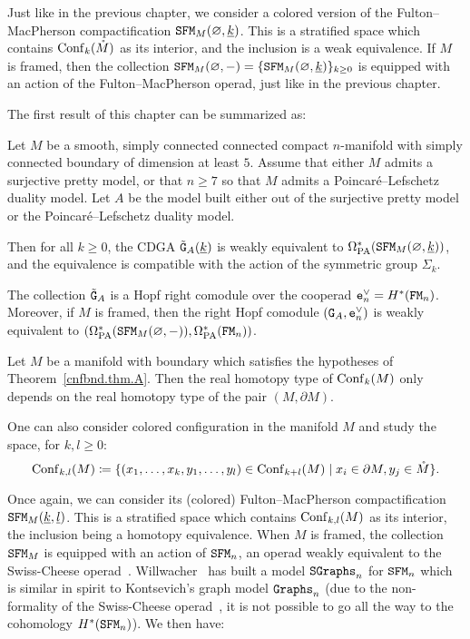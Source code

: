 Just like in the previous chapter, we consider a colored version of the Fulton--MacPherson compactification $\mathtt{SFM}_{M}(\varnothing, \underline{k})$.
This is a stratified space which contains $\operatorname{Conf}_{k}(\mathring{M})$ as its interior, and the inclusion is a weak equivalence.
If $M$ is framed, then the collection $\mathtt{SFM}_{M}(\varnothing, -) = \{ \mathtt{SFM}_{M}(\varnothing, \underline{k}) \}_{k \geq 0}$ is equipped with an action of the Fulton--MacPherson operad, just like in the previous chapter.

The first result of this chapter can be summarized as:
\begin{theoremintro}
  \label{cnfbnd.thm.A}
  Let $M$ be a smooth, simply connected connected compact $n$-manifold with simply connected boundary of dimension at least $5$.
  Assume that either $M$ admits a surjective pretty model, or that $n \geq 7$ so that $M$ admits a Poincaré--Lefschetz duality model.
  Let $A$ be the model built either out of the surjective pretty model or the Poincaré--Lefschetz duality model.

  Then for all $k \geq 0$, the CDGA $\tilde{\mathtt{G}}_{A}(\underline{k})$ is weakly equivalent to $\Omega_{\mathrm{PA}}^{*}(\mathtt{SFM}_{M}(\varnothing, \underline{k}))$, and the equivalence is compatible with the action of the symmetric group $\Sigma_{k}$.

  The collection $\tilde{\mathtt{G}}_{A}$ is a Hopf right comodule over the cooperad $\mathtt{e}_{n}^{\vee} = H^{*}(\mathtt{FM}_{n})$.
  Moreover, if $M$ is framed, then the right Hopf comodule $(\mathtt{G}_{A}, \mathtt{e}_{n}^{\vee})$ is weakly equivalent to $(\Omega_{\mathrm{PA}}^{*}(\mathtt{SFM}_{M}(\varnothing,-)), \Omega_{\mathrm{PA}}^{*}(\mathtt{FM}_{n}))$.
\end{theoremintro}

\begin{corollaryintro}
  \label{cnfbnd.cor.I}
  Let $M$ be a manifold with boundary which satisfies the hypotheses of Theorem~\ref{cnfbnd.thm.A}.
  Then the real homotopy type of $\operatorname{Conf}_{k}(M)$ only depends on the real homotopy type of the pair $(M, \partial M)$.
\end{corollaryintro}

One can also consider colored configuration in the manifold $M$ and study the space, for $k,l \ge 0$:
\[ \operatorname{Conf}_{k,l}(M) \coloneqq \{ (x_{1}, \dots, x_{k}, y_{1}, \dots, y_{l}) \in \operatorname{Conf}_{k+l}(M) \mid x_{i} \in \partial M, y_{j} \in \mathring{M} \}. \]

Once again, we can consider its (colored) Fulton--MacPherson compactification $\mathtt{SFM}_{M}(\underline{k}, \underline{l})$.
This is a stratified space which contains $\operatorname{Conf}_{k,l}(M)$ as its interior, the inclusion being a homotopy equivalence.
When $M$ is framed, the collection $\mathtt{SFM}_{M}$ is equipped with an action of $\mathtt{SFM}_{n}$, an operad weakly equivalent to the Swiss-Cheese operad~\cite{Voronov1999}.
Willwacher~\cite{Willwacher2015a} has built a model $\mathtt{SGraphs}_{n}$ for $\mathtt{SFM}_{n}$ which is similar in spirit to Kontsevich's graph model $\mathtt{Graphs}_{n}$ (due to the non-formality of the Swiss-Cheese operad~\cite{Livernet2015}, it is not possible to go all the way to the cohomology $H^{*}(\mathtt{SFM}_{n})$).
We then have:

